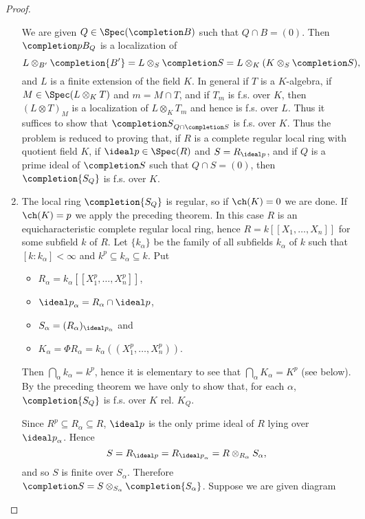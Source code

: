 \documentclass[../main]{subfiles}
\begin{document}
\begin{proof}
\begin{enumerate}[label = Step \Roman*.]
    We are given $Q \in \Spec(\completion B)$ such that $Q \cap B = (0)$. Then ${\completion pB_Q}$ is a localization of \[L \otimes_{B'} \completion {B'} = L \otimes_S {\completion S} = L \otimes_K (K \otimes_S {\completion S}),\] and $L$ is a finite extension of the field $K$. In general if $T$ is a $K$-algebra, if $M \in \Spec(L \otimes_K T)$ and $m = M \cap T$, and if $T_m$ is f.s. over $K$, then $(L \otimes T)_M$ is a localization of $L \otimes_K T_m$ and hence is f.s. over $L$. Thus it suffices to show that ${\completion S}_{Q \cap {\completion S}}$ is f.s. over $K$. Thus the problem is reduced to proving that, if $R$ is a complete regular local ring with quotient field $K$, if $\ideal p \in \Spec(R)$ and $S = R_{\ideal p}$, and if $Q$ is a prime ideal of $\completion S$ such that $Q \cap S = (0)$, then ${\completion{S_Q}}$ is f.s. over $K$. 
    \item The local ring $\completion {S_Q}$ is regular, so if $\ch(K) = 0$ we are done. If $\ch(K) = p$ we apply the preceding theorem. In this case $R$ is an equicharacteristic complete regular local ring, hence $R = k[[X_1, \ldots, X_n]]$ for some subfield $k$ of $R$. Let $\{k_\alpha\}$ be the family of all subfields $k_\alpha$ of $k$ such that $[k : k_\alpha] < \infty$ and $k^p \subseteq k_\alpha \subseteq k$. Put 
    \begin{itemize}
        \item $R_\alpha = k_\alpha[[X_1^p, \ldots, X_n^p]]$,
        \item  ${\ideal p}_\alpha = R_\alpha \cap \ideal p$,
        \item $S_\alpha = (R_\alpha)_{\ideal p_\alpha}$ and
        \item $K_\alpha = \Phi R_\alpha = k_\alpha((X_1^p, \ldots, X_n^p)).$
    \end{itemize}
    Then $\bigcap_\alpha k_\alpha = k^p$, hence it is elementary to see that $\bigcap_\alpha K_\alpha = K^p$ (see below). By the preceding theorem we have only to show that, for each $\alpha$, $\completion {S_Q}$ is f.s. over $K$ rel. $K_Q$. 

    Since $R^p \subseteq R_\alpha \subseteq R$, $\ideal p$ is the only prime ideal of $R$ lying over ${\ideal p}_\alpha$. Hence \[S = R_{\ideal p} = R_{{\ideal p}_\alpha} = R \otimes_{R_\alpha} S_\alpha,\] and so $S$ is finite over $S_\alpha$. Therefore $\completion S = S \otimes_{S_\alpha} \completion {S_\alpha}$. Suppose we are given diagram 

\begin{center}
\end{center}


\end{enumerate}
\end{proof}
\end{document}
